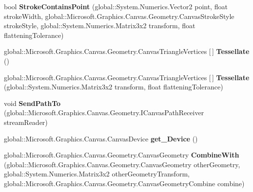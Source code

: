 \begin{DoxyCompactItemize}
bool {\bfseries Stroke\+Contains\+Point} (global\+::\+System.\+Numerics.\+Vector2 point, float stroke\+Width, global\+::\+Microsoft.\+Graphics.\+Canvas.\+Geometry.\+Canvas\+Stroke\+Style stroke\+Style, global\+::\+System.\+Numerics.\+Matrix3x2 transform, float flattening\+Tolerance)
\item 
\mbox{\label{interface_microsoft_1_1_graphics_1_1_canvas_1_1_geometry_1_1_i_canvas_geometry_a3dc1c0c2642c9d24d0f9bae6c3181968}} 
global\+::\+Microsoft.\+Graphics.\+Canvas.\+Geometry.\+Canvas\+Triangle\+Vertices \mbox{[}$\,$\mbox{]} {\bfseries Tessellate} ()
\item 
\mbox{\label{interface_microsoft_1_1_graphics_1_1_canvas_1_1_geometry_1_1_i_canvas_geometry_a2f5903941962961821c79b2142291f25}} 
global\+::\+Microsoft.\+Graphics.\+Canvas.\+Geometry.\+Canvas\+Triangle\+Vertices \mbox{[}$\,$\mbox{]} {\bfseries Tessellate} (global\+::\+System.\+Numerics.\+Matrix3x2 transform, float flattening\+Tolerance)
\item 
\mbox{\label{interface_microsoft_1_1_graphics_1_1_canvas_1_1_geometry_1_1_i_canvas_geometry_a085e2ad8f4fb755784ee6b62d52ca3c1}} 
void {\bfseries Send\+Path\+To} (global\+::\+Microsoft.\+Graphics.\+Canvas.\+Geometry.\+I\+Canvas\+Path\+Receiver stream\+Reader)
\item 
\mbox{\label{interface_microsoft_1_1_graphics_1_1_canvas_1_1_geometry_1_1_i_canvas_geometry_a53a8c779859965ce77af229c8b35d7dd}} 
global\+::\+Microsoft.\+Graphics.\+Canvas.\+Canvas\+Device {\bfseries get\+\_\+\+Device} ()
\item 
\mbox{\label{interface_microsoft_1_1_graphics_1_1_canvas_1_1_geometry_1_1_i_canvas_geometry_a6815c1deb8e9baa248c965b9a8f12fe7}} 
global\+::\+Microsoft.\+Graphics.\+Canvas.\+Geometry.\+Canvas\+Geometry {\bfseries Combine\+With} (global\+::\+Microsoft.\+Graphics.\+Canvas.\+Geometry.\+Canvas\+Geometry other\+Geometry, global\+::\+System.\+Numerics.\+Matrix3x2 other\+Geometry\+Transform, global\+::\+Microsoft.\+Graphics.\+Canvas.\+Geometry.\+Canvas\+Geometry\+Combine combine)

\end{DoxyCompactItemize}
